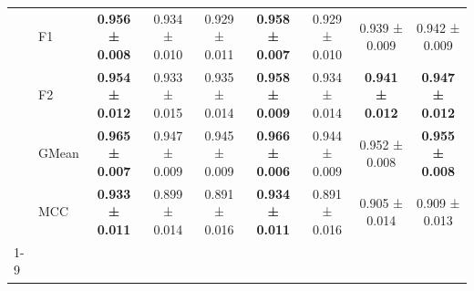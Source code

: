 \begin{table}[H]
{\begin{tabular}{llccccccc}
 & F1 & \textbf{0.956 ± 0.008} & 0.934 ± 0.010 & 0.929 ± 0.011 & \textbf{0.958 ± 0.007} & 0.929 ± 0.010 & 0.939 ± 0.009 & 0.942 ± 0.009 \\
 & F2 & \textbf{0.954 ± 0.012} & 0.933 ± 0.015 & 0.935 ± 0.014 & \textbf{0.958 ± 0.009} & 0.934 ± 0.014 & \textbf{0.941 ± 0.012} & \textbf{0.947 ± 0.012} \\
 & GMean & \textbf{0.965 ± 0.007} & 0.947 ± 0.009 & 0.945 ± 0.009 & \textbf{0.966 ± 0.006} & 0.944 ± 0.009 & 0.952 ± 0.008 & \textbf{0.955 ± 0.008} \\
 & MCC & \textbf{0.933 ± 0.011} & 0.899 ± 0.014 & 0.891 ± 0.016 & \textbf{0.934 ± 0.011} & 0.891 ± 0.016 & 0.905 ± 0.014 & 0.909 ± 0.013 \\
\cline{1-9}
\bottomrule
\end{tabular}
    }
\end{table}

